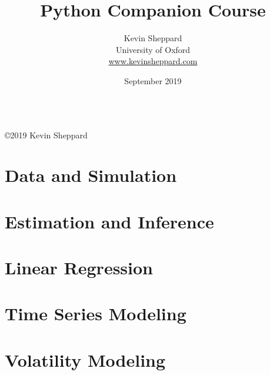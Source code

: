 \documentclass[11pt, a4paper]{book}
\title{Python Companion Course}
\author{Kevin Sheppard\\
University of Oxford\\
\href{https://www.kevinsheppard.com}{www.kevinsheppard.com}}
\date{September 2019}
\begin{document}
\maketitle
\begin{tabular}{c}
\tabularnewline
\end{tabular}

\thispagestyle{empty}

\vfill{}

\begin{center}
\textsf{\footnotesize{}©}2019 Kevin Sheppard
\par\end{center}
\thispagestyle{empty}\tableofcontents{}\thispagestyle{empty}
\mainmatter
\chapter{Data and Simulation}



\chapter{Estimation and Inference}



\chapter{Linear Regression}



\chapter{Time Series Modeling}





\chapter{Volatility Modeling}



\end{document}
